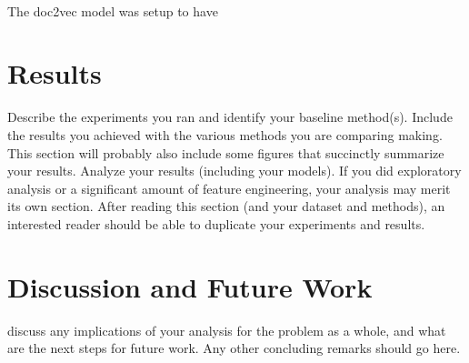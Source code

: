 \documentclass[11pt, oneside]{article}
\begin{document}
\paragraph{}
The doc2vec model was setup to have 
\section{Results}
Describe the experiments you ran and identify your baseline method(s). Include the results you achieved with the various methods you are comparing making. This section will probably also include some figures that succinctly summarize your results. Analyze your results (including your models). If you did exploratory analysis or a significant amount of feature engineering, your analysis may merit its own section. After reading this section (and your dataset and methods), an interested reader should be able to duplicate your experiments and results.
\section{Discussion and Future Work}
discuss any implications of your analysis for the problem as a whole, and what are the next steps for future work. Any other concluding remarks should go here.


\end{document}
